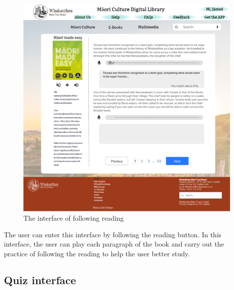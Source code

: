 \begin{figure}[htbp]
  \centerline{\includegraphics[width=400pt]{images/3-2-3.png}}
  \caption{The interface of following reading}
  \label{fig30}
\end{figure}

The user can enter this interface by following the reading button. In this interface, the user can play each paragraph of the book and carry out the practice of following the reading to help the user better study.

\subsection{Quiz interface}

